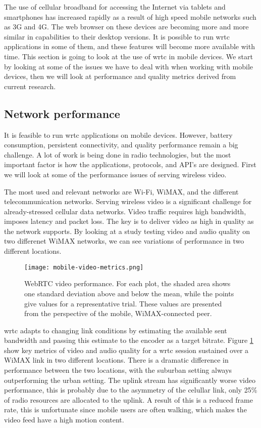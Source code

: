 
The use of cellular broadband for accessing the Internet via tablets and smartphones has increased rapidly as a result of high speed mobile networks such as 3G and 4G. The web browser on these devices are becoming more and more similar in capabilities to their desktop versions. It is possible to run \gls{wrtc} applications in some of them, and these features will become more available with time. This section is going to look at the use of \gls{wrtc} in mobile devices. We start by looking at some of the issues we have to deal with when working with mobile devices, then we will look at performance and quality metrics derived from current research.

\subsection{Network performance}
It is feasible to run \gls{wrtc} applications on mobile devices. However, battery consumption,  persistent connectivity, and quality performance remain a big challenge. A lot of work is being done in radio technologies, but the most important factor is how the applications, protocols, and API's are designed\cite{isomaki2012considerations}. First we will look at some of the performance issues of serving wireless video.

The most used and relevant networks are Wi-Fi, WiMAX, and the different telecommunication networks. Serving wireless video is a significant challenge for already-stressed cellular data networks\cite{erman2011over}. Video traffic requires high bandwidth, imposes latency and packet loss. The key is to deliver video as high in quality as the network supports. By looking at a study testing video and audio quality on two differenet WiMAX networks\cite{fund2013performance}, we can see variations of performance in two different locations.

\pagebreak
\begin{figure}[here]
\centerline{\texttt{[image: mobile-video-metrics.png]}}
\caption{WebRTC video performance. For each plot, the shaded area shows one standard deviation above and below the mean, while the
points give values for a representative trial. These values are presented from the perspective of the mobile, WiMAX-connected peer.
}
\label{fig:mobile-video-metrics}
\end{figure}

\gls{wrtc} adapts to changing link conditions by estimating the available sent bandwidth and passing this estimate to the encoder as a target bitrate. Figure \ref{fig:mobile-video-metrics} show key metrics of video and audio quality for a \gls{wrtc} session sustained over a WiMAX link in two different locations. There is a dramatic difference in performance between the two locations, with the suburban setting always outperforming the urban setting. The uplink stream has significantly worse video performance, this is probably due to the asymmetry of the celullar link, only 25\% of radio resources are allocated to the uplink\cite{fund2013performance}. A result of this is a reduced frame rate, this is unfortunate since mobile users are often walking, which makes the video feed have a high motion content.


